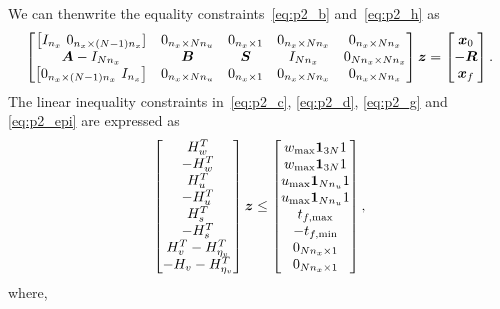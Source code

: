 \documentclass[12pt]{article}
\begin{document}
We can thenwrite the equality constraints~\eqref{eq:p2_b} and~\eqref{eq:p2_h} as
\begin{equation}
\begin{bmatrix}
\big[ I_{n_x} \ 0_{n_x \times (N-1)n_x}] & 0_{n_x \times N n_u} & 0_{n_x \times 1} & 0_{n_x \times N n_x} & 0_{n_x \times N n_x} \\
\bm{A} - I_{N n_x} & \bm{B} & \bm{S} & I_{N n_x} & 0_{N n_x \times N n_x} \\
\big[ 0_{n_x \times (N-1)n_x} \ I_{n_x} \big] & 0_{n_x \times N n_u} & 0_{n_x \times 1} & 0_{n_x \times Nn_x} & 0_{n_x \times N n_x}
\end{bmatrix} \bm{z} = \begin{bmatrix}
\bm{x}_0 \\ -\bm{R} \\ \bm{x}_f
\end{bmatrix}.
\label{eq:std_equality}
\end{equation}
The linear inequality constraints in~\eqref{eq:p2_c}, \eqref{eq:p2_d}, \eqref{eq:p2_g} and \eqref{eq:p2_epi} are expressed as
\begin{equation}
\begin{bmatrix}
H_w^T \\ - H_w^T \\ H_u^T \\ - H_u^T \\ H_s^T \\ - H_s^T \\ H_v^T - H_{\eta_v}^T \\ -H_v - H_{\eta_v}^T
\end{bmatrix} \bm{z} \leq \begin{bmatrix}
w_{\max} \bm{1}_{3N}{1} \\ w_{\max} \bm{1}_{3N}{1} \\ u_{\max} \bm{1}_{N n_u}{1} \\ u_{\max} \bm{1}_{N n_u}{1} \\ t_{f,\max} \\ -t_{f,\min} \\ 0_{N n_x \times 1} \\ 0_{N n_x \times 1}
\end{bmatrix},
\label{eq:std_ineq_lin}
\end{equation}
where,
\end{document}
